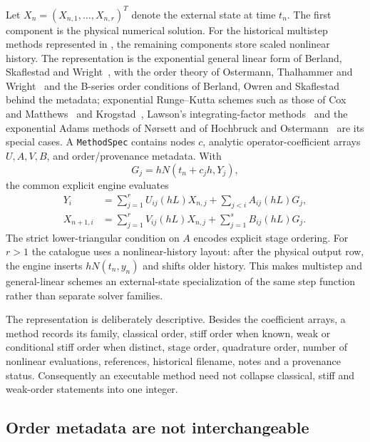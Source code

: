 Let $X_n=(X_{n,1},\ldots,X_{n,r})^T$ denote the external state at time $t_n$.
The first component is the physical numerical solution.  For the historical
multistep methods represented in \pkg{}, the remaining components store scaled
nonlinear history.  The representation is the exponential general linear form
of Berland, Skaflestad and Wright~\cite{BerlandSkaflestadWright2007}, with the
order theory of Ostermann, Thalhammer and
Wright~\cite{OstermannThalhammerWright2006} and the B-series order conditions
of Berland, Owren and Skaflestad~\cite{BerlandOwrenSkaflestad2005} behind the
metadata; exponential Runge--Kutta schemes such as those of Cox and
Matthews~\cite{CoxMatthews2002} and Krogstad~\cite{Krogstad2005}, Lawson's
integrating-factor methods~\cite{Lawson1967} and the exponential Adams methods
of N{\o}rsett and of Hochbruck and Ostermann~\cite{HochbruckOstermann2011}
are its special cases.  A \texttt{MethodSpec} contains nodes $c$, analytic
operator-coefficient arrays $U,A,V,B$, and order/provenance metadata.  With
\begin{equation}
 G_j=hN(t_n+c_jh,Y_j),
\end{equation}
the common explicit engine evaluates
\begin{align}
 Y_i
   &=\sum_{j=1}^{r}U_{ij}(hL)X_{n,j}
     +\sum_{j<i}A_{ij}(hL)G_j,                        \label{eq:eglm-stage}\\
 X_{n+1,i}
   &=\sum_{j=1}^{r}V_{ij}(hL)X_{n,j}
     +\sum_{j=1}^{s}B_{ij}(hL)G_j.                   \label{eq:eglm-output}
\end{align}
The strict lower-triangular condition on $A$ encodes explicit stage ordering.
For $r>1$ the catalogue uses a nonlinear-history layout: after the physical
output row, the engine inserts $hN(t_n,y_n)$ and shifts older history.  This
makes multistep and general-linear schemes an external-state specialization of
the same step function rather than separate solver families.

The representation is deliberately descriptive.  Besides the coefficient
arrays, a method records its family, classical order, stiff order when known,
weak or conditional stiff order when distinct, stage order, quadrature order,
number of nonlinear evaluations, references, historical filename, notes and a
provenance status.  Consequently an executable method need not collapse
classical, stiff and weak-order statements into one integer.

\subsection{Order metadata are not interchangeable}

